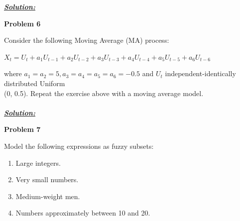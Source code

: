 \documentclass{article}
\begin{document}
\vspace{1cm}

\noindent \underline{\textbf{\textit{Solution:}}}


\newpage
\noindent \textbf{Problem 6}

\noindent Consider the following Moving Average (MA) process:
\begin{center}
    $X_t = U_t + a_1U_{t-1} + a_2U_{t-2} + a_3U_{t-3} + a_4U_{t-4}+ a_5U_{t-5}+ a_6U_{t-6}$
\end{center}
\noindent where $a_1= a_2=5, a_3=a_4=a_5=a_6= -0.5$ and $U_t$ independent-identically distributed Uniform \\
(0, 0.5). 
Repeat the exercise above with a moving average model. \\ \\

\noindent \underline{\textbf{\textit{Solution:}}}



\newpage
\noindent \textbf{Problem 7}

\noindent Model the following expressions as fuzzy subsets:
\begin{enumerate} [label = \Alph*]
    \item Large integers.
    \item Very small numbers.
    \item Medium-weight men.
    \item Numbers approximately between 10 and 20.
\end{enumerate}

\vspace{1cm}
\end{document}
